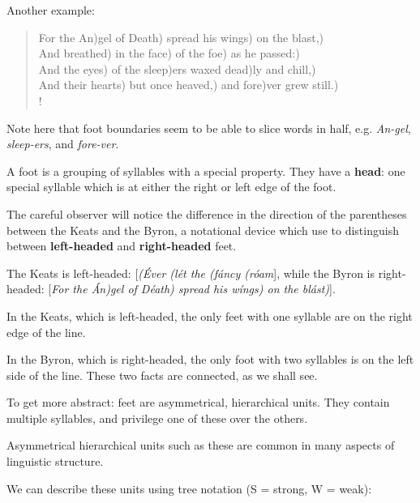 \ex Another example:
\begin{verse}
  For the An)gel of Death) spread his wings) on the blast,)\\
  And breathed) in the face) of the foe) as he passed:)\\
  And the eyes) of the sleep)ers waxed dead)ly and chill,)\\
  And their hearts) but once heaved,) and fore)ver grew still.)\\!
\end{verse}
\xe

\ex Note here that foot boundaries seem to be able to slice words in half, e.g. \textit{An-gel}, \textit{sleep-ers}, and \textit{fore-ver}.
\xe

\ex A foot is a grouping of syllables with a special property. They have a \textbf{head}: one special syllable which is at either the right or left edge of the foot.
\xe

\ex The careful observer will notice the difference in the direction of the parentheses between the Keats and the Byron, a notational device which \textcite{fabb2008meter} use to distinguish between \textbf{left-headed} and \textbf{right-headed} feet.
\xe

\ex The Keats is left-headed: [\textit{(Éver (lét the (fáncy (róam}], while the Byron is right-headed: [\textit{For the Án)gel of Déath) spread his wíngs) on the blást)}].
\xe

\ex In the Keats, which is left-headed, the only feet with one syllable are on the right edge of the line.
\xe

\ex In the Byron, which is right-headed, the only foot with two syllables is on the left side of the line. These two facts are connected, as we shall see.
\xe

\ex To get more abstract: feet are asymmetrical, hierarchical units. They contain multiple syllables, and privilege one of these over the others.
\xe

\ex Asymmetrical hierarchical units such as these are common in many aspects of linguistic structure.
\xe

\ex
  We can describe these units using tree notation (S = strong, W = weak):

\xe

